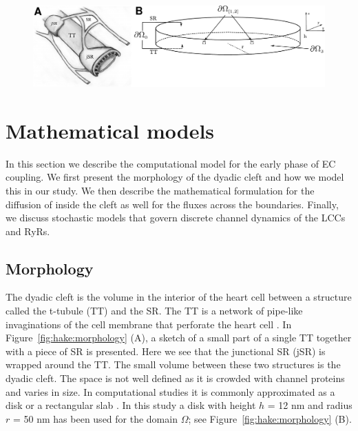 \begin{figure}
  {\includegraphics[width=\fullfig]{chapters/hake/pdf/morphology}}
\end{figure}

\section{Mathematical models}
\label{sec:hake:mathematical-models}

In this section we describe the computational model for the early
phase of EC coupling. We first present the morphology of the dyadic
cleft and how we model this in our study. We then describe the
mathematical formulation for the diffusion of \Ca inside the cleft as
well for the \Ca fluxes across the boundaries. Finally, we discuss
stochastic models that govern discrete channel dynamics of the LCCs
and RyRs.

\subsection{Morphology}
\label{sec:hake:morphology}
  

The dyadic cleft is the volume in the interior of the heart cell
between a structure called the t-tubule (TT) and the SR. The TT is a
network of pipe-like invaginations of the cell membrane that perforate
the heart cell \citep{SoellerCannell1999}. In
Figure~\ref{fig:hake:morphology} (A), a sketch of a small part of
a single TT together with a piece of SR is presented. Here we see that
the junctional SR (jSR) is wrapped around the TT. The small volume
between these two structures is the dyadic cleft. The space is not
well defined as it is crowded with channel proteins and varies in
size. In computational studies it is commonly approximated as a disk
or a rectangular slab
\citep{PeskoffPostLanger1992,SoellerCannell1997,KohSrinivasanChingEtAl2006,
  TanskanenGreensteinChenEtAl2007}. In this study a disk with height
$h$ = 12 nm and radius $r$ = 50 nm has been used for the domain
$\Omega$; see Figure~\ref{fig:hake:morphology} (B).

